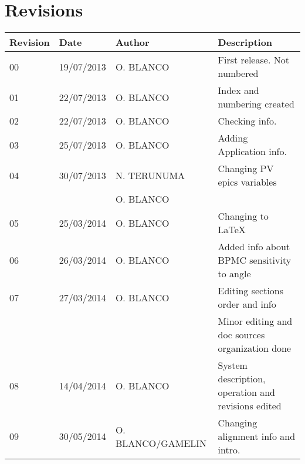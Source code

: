 \section{Revisions}
\begin{tabular}{|l|l|l|l|}\hline
Revision&Date&Author&Description\\\hline\hline
00&19/07/2013&O. BLANCO&First release. Not numbered\\\hline
01&22/07/2013&O. BLANCO&Index and numbering created\\\hline
02&22/07/2013&O. BLANCO&Checking info.\\\hline
03&25/07/2013&O. BLANCO&Adding Application info.\\\hline
04&30/07/2013&N. TERUNUMA&Changing PV epics variables\\
&&O. BLANCO&\\\hline
05&25/03/2014&O. BLANCO&Changing to \LaTeX\\\hline
06&26/03/2014&O. BLANCO&Added info about BPMC sensitivity to angle\\\hline
07&27/03/2014&O. BLANCO&Editing sections order and info\\
&&&Minor editing and doc sources organization done\\\hline
08&14/04/2014&O. BLANCO&System description, operation and revisions edited\\\hline
09&30/05/2014&O. BLANCO/GAMELIN&Changing alignment info and intro.\\\hline
\end{tabular}


